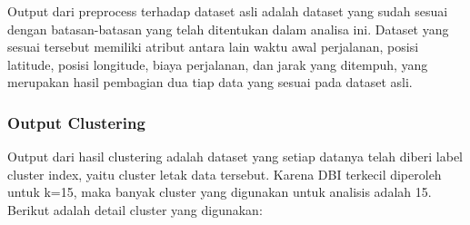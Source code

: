 \documentclass{article}
\begin{document}
\begin{adjustwidth}{4em}{0pt}
	
	\hspace{\parindent}Output dari preprocess terhadap dataset asli adalah dataset yang sudah sesuai dengan batasan-batasan yang telah ditentukan dalam analisa ini. Dataset yang sesuai tersebut memiliki atribut antara lain waktu awal perjalanan, posisi latitude, posisi longitude, biaya perjalanan, dan jarak yang ditempuh, yang merupakan hasil pembagian dua tiap data yang sesuai pada dataset asli.

\end{adjustwidth}

\subsubsection{Output Clustering}

\begin{adjustwidth}{4em}{0pt}
	
	\hspace{\parindent}Output dari hasil clustering adalah dataset yang setiap datanya telah diberi label cluster index, yaitu cluster letak data tersebut. Karena DBI terkecil diperoleh untuk k=15, maka banyak cluster yang digunakan untuk analisis adalah 15. Berikut adalah detail cluster yang digunakan:

\end{adjustwidth}
\end{document}

